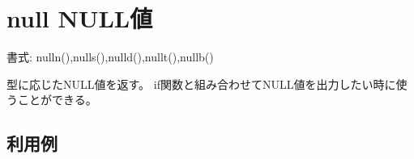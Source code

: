 
%

\section{null NULL値\label{sect:null}}

書式: nulln(),nulls(),nulld(),nullt(),nullb()

型に応じたNULL値を返す。
if関数と組み合わせてNULL値を出力したい時に使うことができる。

\subsection*{利用例}


%

